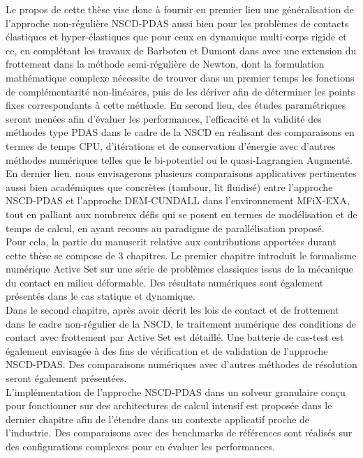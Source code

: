 Le propos de cette thèse vise donc à fournir en premier lieu une généralisation de l'approche non-régulière NSCD-PDAS aussi bien pour les problèmes de contacts élastiques et hyper-élastiques que pour ceux en dynamique multi-corps rigide et ce, en complétant les travaux de Barboteu et Dumont dans \cite{barboteu2018primal} avec une extension du frottement dans la méthode semi-régulière de Newton, dont la formulation mathématique complexe nécessite de trouver dans un premier temps les fonctions de complémentarité non-linéaires, puis de les dériver afin de déterminer les points fixes correspondants à cette méthode. En second lieu, des études paramétriques seront menées afin d'évaluer les performances, l'efficacité et la validité des méthodes type PDAS dans le cadre de la NSCD en réalisant des comparaisons en termes de temps CPU, d'itérations et de conservation d'énergie avec d'autres méthodes numériques telles que le bi-potentiel ou le quasi-Lagrangien Augmenté. En dernier lieu, nous envisagerons  plusieurs comparaisons applicatives pertinentes aussi bien académiques que concrètes (tambour, lit fluidisé) entre l'approche NSCD-PDAS et l'approche DEM-CUNDALL dans l'environnement MFiX-EXA, tout en palliant aux nombreux  défis qui se posent en termes de modélisation et de temps de calcul, en ayant recours au paradigme de parallélisation proposé.\\

Pour cela, la partie du manuscrit relative aux contributions apportées durant cette thèse se compose de 3 chapitres. Le premier chapitre introduit le formalisme numérique Active Set sur une série de problèmes classiques issus de la mécanique du contact en milieu déformable. Des résultats numériques sont également présentés dans le cas statique et dynamique.\\
Dans le second chapitre, après avoir décrit les lois de contact et de frottement dans le cadre non-régulier de la NSCD, le traitement numérique des conditions de contact avec frottement par Active Set est détaillé. Une batterie de cas-test est également envisagée à des fins de vérification et de validation de l'approche NSCD-PDAS. Des comparaisons numériques avec d'autres méthodes de résolution seront également présentées.\\
L'implémentation de l'approche NSCD-PDAS dans un solveur granulaire conçu pour fonctionner sur des architectures de calcul intensif est proposée dans le dernier chapitre afin de l'étendre dans un contexte applicatif proche de l'industrie. Des comparaisons avec des benchmarks de références sont réalisés sur des configurations complexes pour en évaluer les performances. 